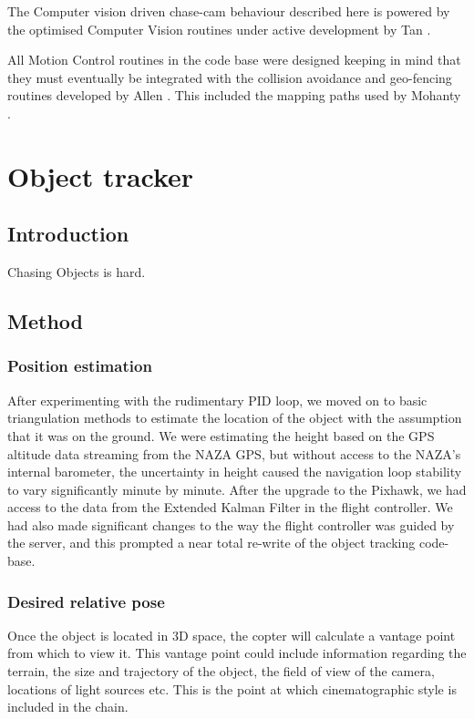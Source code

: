 \documentclass{article}
\begin{document}
      The Computer vision driven chase-cam behaviour described here is powered by the optimised Computer Vision routines under active development by Tan \cite{Tan}.

      All Motion Control routines in the code base were designed keeping in mind that they must eventually be integrated with the collision avoidance and geo-fencing routines developed by Allen \cite{Allen}.  This included the mapping paths used by Mohanty \cite{Mohanty}.

\section{Object tracker}
  \subsection{Introduction}
  Chasing Objects is hard.

  \subsection{Method}

    \subsubsection{Position estimation}
      After experimenting with the rudimentary PID loop, we moved on to basic triangulation methods to estimate the location of the object with the assumption that it was on the ground.  We were estimating the height based on the GPS altitude data streaming from the NAZA GPS, but without access to the NAZA's internal barometer, the uncertainty in height caused the navigation loop stability to vary significantly minute by minute.
      After the upgrade to the Pixhawk, we had access to the data from the Extended Kalman Filter in the flight controller.  We had also made significant changes to the way the flight controller was guided by the server, and this prompted a near total re-write of the object tracking code-base.

    \subsubsection{Desired relative pose}
      Once the object is located in 3D space, the copter will calculate a vantage point from which to view it.
      This vantage point could include information regarding the terrain, the size and trajectory of the object, the field of view of the camera, locations of light sources etc.  This is the point at which cinematographic style is included in the chain.
\end{document}
